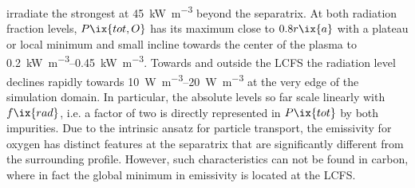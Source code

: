 irradiate the strongest at \SI{45}{\kilo\watt\per\cubic\meter} beyond the separatrix. At both radiation fraction levels, $P\ix{tot,O}$ has its maximum close to $0.8r\ix{a}$ with a plateau or local minimum and small incline towards the center of the plasma to \SIrange{0.2}{0.45}{\kilo\watt\per\cubic\meter}. Towards and outside the LCFS the radiation level declines rapidly towards \SIrange{10}{20}{\watt\per\cubic\meter} at the very edge of the simulation domain. In particular, the absolute levels so far scale linearly with $f\ix{rad}$, i.e. a factor of two is directly represented in $P\ix{tot}$ by both impurities. Due to the intrinsic ansatz for particle transport, the emissivity for oxygen has distinct features at the separatrix that are significantly different from the surrounding profile. However, such characteristics can not be found in carbon, where in fact the global minimum in emissivity is located at the LCFS.\\%
%
        \begin{figure}[t]%
            \centering%
            \begin{minipage}[c]{0.48\textwidth}%
                \centering%
            \end{minipage}%
            \hfill%
            \begin{minipage}[c]{0.48\textwidth}%
                \centering%
            \end{minipage}%
            \label{fig:nete_abund_lines_91_92}%
        \end{figure}%
